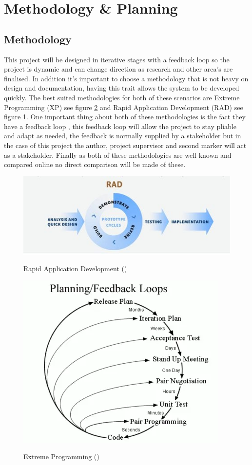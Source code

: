 \section{Methodology \& Planning}
\subsection{Methodology}
This project will be designed in iterative stages with a feedback loop so the project is dynamic and can change direction as research and other area's are finalised. In addition it's important to choose a methodology that is not heavy on design and documentation, having this trait allows the system to be developed quickly. The best suited methodologies for both of these scenarios are Extreme Programming (XP) see figure \ref{fig:xp} and Rapid Application Development (RAD) see figure \ref{fig:rad}. One important thing about both of these methodologies is the fact they have a feedback loop , this feedback loop will allow the project to stay pliable and adapt as needed, the feedback is normally supplied by a stakeholder but in the case of this project the author, project supervisor and second marker will act as a stakeholder. Finally as both of these methodologies are well known and compared online no direct comparison will be made of these.

\begin{figure}[h]
	\includegraphics[width=\linewidth]{./images/methodology/RAD.png}\\
	\caption{Rapid Application Development (\cite{ankitasingh_2019_what})}
	\label{fig:rad}
\end{figure}
\begin{figure}[h]
	\includegraphics[width=0.5\linewidth]{./images/methodology/XP.png}\\
	\caption{Extreme Programming (\cite{ponomareff_learning})}
	\label{fig:xp}
\end{figure}


